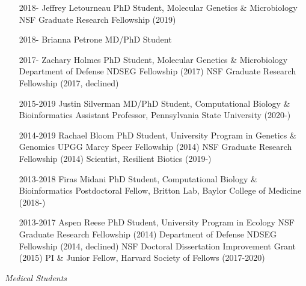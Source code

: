 \documentclass[overlapped,line,11pt]{res}
\begin{document}
\begin{resume}
\begin{itemize}[leftmargin=2cm, style=sameline, itemsep=0mm]
\item[2018-] Jeffrey Letourneau \newline 
  PhD Student, Molecular Genetics \& Microbiology \newline
  NSF Graduate Research Fellowship (2019)
\item[2018-] Brianna Petrone \newline 
  MD/PhD Student
\item[2017-] Zachary Holmes \newline 
  PhD Student, Molecular Genetics \& Microbiology \newline
  Department of Defense NDSEG Fellowship (2017) \newline
  NSF Graduate Research Fellowship (2017, declined)
\item[2015-2019] Justin Silverman \newline 
  MD/PhD Student, Computational Biology \& Bioinformatics \newline
  Assistant Professor, Pennsylvania State University (2020-)
\item[2014-2019] Rachael Bloom \newline 
  PhD Student, University Program in Genetics \& Genomics \newline
  UPGG Marcy Speer Fellowship (2014) \newline
  NSF Graduate Research Fellowship (2014) \newline
  Scientist, Resilient Biotics (2019-)
\item[2013-2018] Firas Midani \newline 
  PhD Student, Computational Biology \& Bioinformatics \newline
  Postdoctoral Fellow, Britton Lab, Baylor College of Medicine (2018-)
\item[2013-2017] Aspen Reese \newline 
  PhD Student, University Program in Ecology \newline
  NSF Graduate Research Fellowship (2014) \newline
  Department of Defense NDSEG Fellowship (2014, declined) \newline
  NSF Doctoral Dissertation Improvement Grant (2015) \newline
  PI \& Junior Fellow, Harvard Society of Fellows (2017-2020) 
\end{itemize}

\vspace{-.1in}
\emph{Medical Students}
\vspace{.1in}
\begin{itemize}[leftmargin=2cm, style=sameline, itemsep=0mm]


\end{itemize}
\end{resume}
\end{document}
